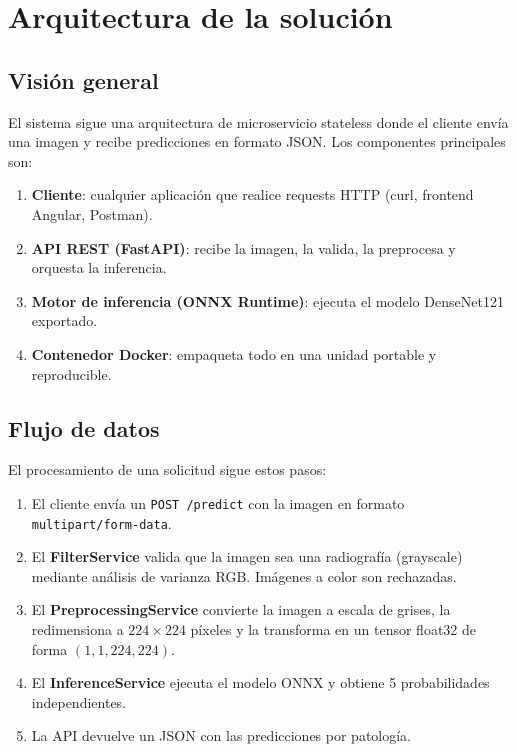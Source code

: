 \section{Arquitectura de la soluci\'on}
\label{sec:architecture}

\subsection{Visi\'on general}

El sistema sigue una arquitectura de microservicio stateless donde el cliente env\'ia una imagen y recibe predicciones en formato JSON. Los componentes principales son:

\begin{enumerate}
    \item \textbf{Cliente}: cualquier aplicaci\'on que realice requests HTTP (curl, frontend Angular, Postman).
    \item \textbf{API REST (FastAPI)}: recibe la imagen, la valida, la preprocesa y orquesta la inferencia.
    \item \textbf{Motor de inferencia (ONNX Runtime)}: ejecuta el modelo DenseNet121 exportado.
    \item \textbf{Contenedor Docker}: empaqueta todo en una unidad portable y reproducible.
\end{enumerate}

\subsection{Flujo de datos}

El procesamiento de una solicitud sigue estos pasos:

\begin{enumerate}
    \item El cliente env\'ia un \texttt{POST /predict} con la imagen en formato \texttt{multipart/form-data}.
    \item El \textbf{FilterService} valida que la imagen sea una radiograf\'ia (grayscale) mediante an\'alisis de varianza RGB. Im\'agenes a color son rechazadas.
    \item El \textbf{PreprocessingService} convierte la imagen a escala de grises, la redimensiona a $224 \times 224$ p\'ixeles y la transforma en un tensor float32 de forma $(1, 1, 224, 224)$.
    \item El \textbf{InferenceService} ejecuta el modelo ONNX y obtiene 5 probabilidades independientes.
    \item La API devuelve un JSON con las predicciones por patolog\'ia.
\end{enumerate}

